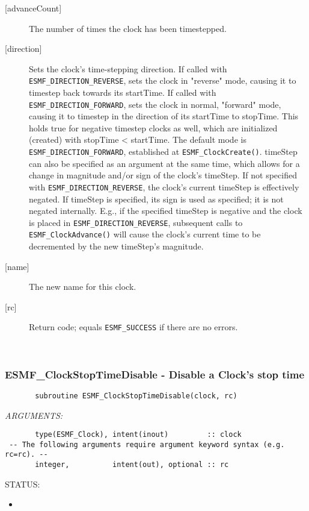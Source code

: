 \begin{description}
       \item[{[advanceCount]}]
            The number of times the clock has been timestepped.
       \item[{[direction]}]
            Sets the clock's time-stepping direction.  If called with
            {\tt ESMF\_DIRECTION\_REVERSE}, sets the clock in "reverse" mode,
            causing it to timestep back towards its startTime.  If called
            with {\tt ESMF\_DIRECTION\_FORWARD}, sets the clock in normal,
            "forward" mode, causing it to timestep in the direction of its
            startTime to stopTime.  This holds true for negative timestep
            clocks as well, which are initialized (created) with
            stopTime < startTime.  The default mode is
            {\tt ESMF\_DIRECTION\_FORWARD}, established at
            {\tt ESMF\_ClockCreate()}.  timeStep can also be specified as an
            argument at the same time, which allows for a change in magnitude
            and/or sign of the clock's timeStep.  If not specified with
            {\tt ESMF\_DIRECTION\_REVERSE}, the clock's current timeStep is
            effectively negated.  If timeStep is specified, its sign is used as
            specified; it is not negated internally.  E.g., if the specified
            timeStep is negative and the clock is placed in
            {\tt ESMF\_DIRECTION\_REVERSE}, subsequent calls to
            {\tt ESMF\_ClockAdvance()} will cause the clock's current time to
            be decremented by the new timeStep's magnitude.
       \item[{[name]}]
            The new name for this clock.
       \item[{[rc]}]
            Return code; equals {\tt ESMF\_SUCCESS} if there are no errors.
       \end{description}
   
 
\mbox{}\hrulefill\ 
 
\subsubsection [ESMF\_ClockStopTimeDisable] {ESMF\_ClockStopTimeDisable - Disable a Clock's stop time}


 
\begin{verbatim}       subroutine ESMF_ClockStopTimeDisable(clock, rc)
 \end{verbatim}{\em ARGUMENTS:}
\begin{verbatim}       type(ESMF_Clock), intent(inout)         :: clock
 -- The following arguments require argument keyword syntax (e.g. rc=rc). --
       integer,          intent(out), optional :: rc
 \end{verbatim}
{\sf STATUS:}
   \begin{itemize}
   \item{}
   \end{itemize}
  
